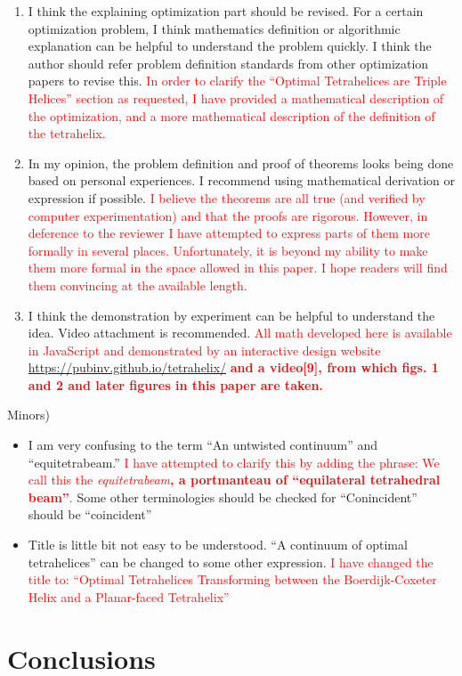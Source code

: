 \documentclass{article}
\newcommand{\highlighttext}[1] {\textcolor{red}{#1}}
\begin{document}
\begin{enumerate}
  \item
    I think the explaining optimization part should be revised. For a certain optimization problem, I think mathematics definition or algorithmic explanation can be helpful to understand the problem quickly. I think the author should refer problem definition standards from other optimization papers to revise this.
    \highlighttext{
      In order to clarify the ``Optimal Tetrahelices are Triple Helices'' section as requested,
      I have provided a mathematical description of the optimization, and a more mathematical
      description of the definition of the tetrahelix.
      }


  \item    
    In my opinion, the problem definition and proof of theorems looks being done based on personal experiences. I recommend using mathematical derivation or expression if possible.
    \highlighttext{
      I believe the theorems are all true (and verified by computer experimentation) and that the proofs
      are rigorous. However, in deference to the reviewer I have attempted to express parts of them
      more formally in several places. Unfortunately, it is beyond my ability to make them more formal
      in the space allowed in this paper. I hope readers will find them convincing at the available length.
      }

  \item    
    I think the demonstration by experiment can be helpful to understand the idea. Video attachment is recommended.
    \highlighttext{
All math
developed here is available in JavaScript and demonstrated by an interactive
design website \url{https://pubinv.github.io/tetrahelix/}\cite{readtetrahelix}
\bf{and a video[9]},
from which figs. 1 and 2 and later figures in this paper 
are taken.      
      }

\end{enumerate}

Minors)

\begin{itemize}
  \item
    I am very confusing to the term “An untwisted continuum” and “equitetrabeam.”
    \highlighttext{I have attempted to clarify this by adding the phrase:
      We call this the \emph{equitetrabeam}\textbf{, a portmanteau of ``equilateral tetrahedral beam''}.}
    Some other terminologies should be checked for 
“Conincident” should be “coincident”
\item
  Title is little bit not easy to be understood. “A continuum of optimal tetrahelices” can be changed to some other expression.
  \highlighttext{
    I have changed the title to:
 ``Optimal Tetrahelices Transforming between the Boerdijk-Coxeter Helix and a Planar-faced Tetrahelix''
}
\end{itemize}


\section{Conclusions}\label{conclusions}



\end{document}
